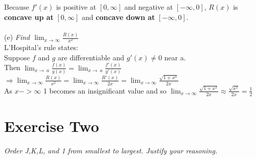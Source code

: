 \documentclass[12pt]{article}
\begin{document}
\noindent Because $f'(x)$ is positive at $[0,\infty]$ and negative at $[-\infty,0]$, $R(x)$ is \textbf{concave  up at} $[0,\infty]$ and \textbf{concave down at} $[-\infty,0]$.
\\~\\
(e) \textit{Find $\lim_{x\to\infty}\frac{R(x)}{x^2}$} \\
L'Hospital's rule states:\\
Suppose $f$ and $g$ are differentiable and $g'(x) \neq 0$ near a. \\
Then $\lim_{x\to\ a} \frac{f(x)}{g(x)} = \lim_{x\to\ a} \frac{f'(x)}{g'(x)}$ \\
$\Rightarrow \lim_{x\to\infty}\frac{R(x)}{x^2} = \lim_{x\to\infty}\frac{R'(x)}{2x} = \lim_{x\to\infty}\frac{\sqrt{1+x^2}}{2x}$ \\
As $x -> \infty$ 1 becomes an insignificant value and so $\lim_{x\to\infty}\frac{\sqrt{1+x^2}}{2x} \approx \frac{\sqrt{x^2}}{2x} = \frac{1}{2}$ \pagebreak

\section{Exercise Two} 
\textit{Order J,K,L, and 1 from smallest to largest. Justify your reasoning.} \\
\end{document}
